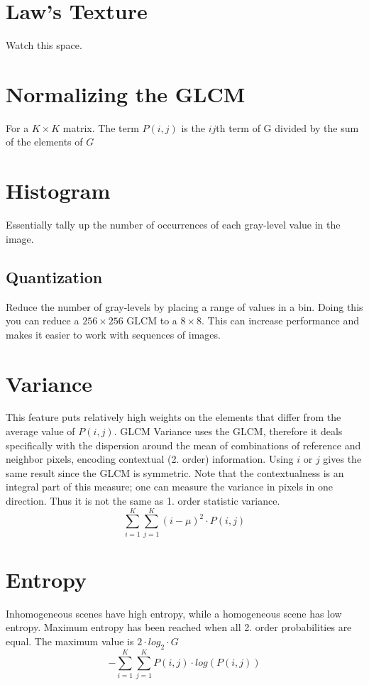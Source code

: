 \documentclass[11pt]{report}
\begin{document}
\section*{Law's Texture}
Watch this space.

\section*{Normalizing the GLCM}
For a $K\times K$ matrix. The term $P(i,j)$ is the $ij$th term of G divided by the sum of the elements of $G$
\section*{Histogram}
Essentially tally up the number of occurrences of each gray-level value in the image.
\subsection*{Quantization}
Reduce the number of gray-levels by placing a range of values in a bin. Doing this you can reduce a $256\times256$ GLCM to a $8\times8$. This can increase performance and makes it easier to work with sequences of images.

\section*{Variance}
This feature puts relatively high weights on the elements that differ from the average value of $P(i,j)$. GLCM Variance uses the GLCM, therefore it deals specifically with the dispersion around the mean of combinations of reference and neighbor pixels, encoding contextual (2. order) information. Using $i$ or $j$ gives the same result since the GLCM is symmetric. Note that the contextualness is an integral part of this measure; one can measure the variance in pixels in one direction. Thus it is not the same as 1. order statistic variance.
\begin{equation}
\sum_{i=1}^{K}\sum_{j=1}^{K}(i - \mu)^2 \cdot P(i,j)
\end{equation}

\section*{Entropy}
Inhomogeneous scenes have high entropy, while a homogeneous scene has low entropy. Maximum entropy has been reached when all 2. order probabilities are equal. The maximum value is $2 \cdot log_2 \cdot G$
\begin{equation}
-\sum_{i=1}^{K}\sum_{j=1}^{K}P(i,j) \cdot log(P(i,j))
\end{equation}
\end{document}
